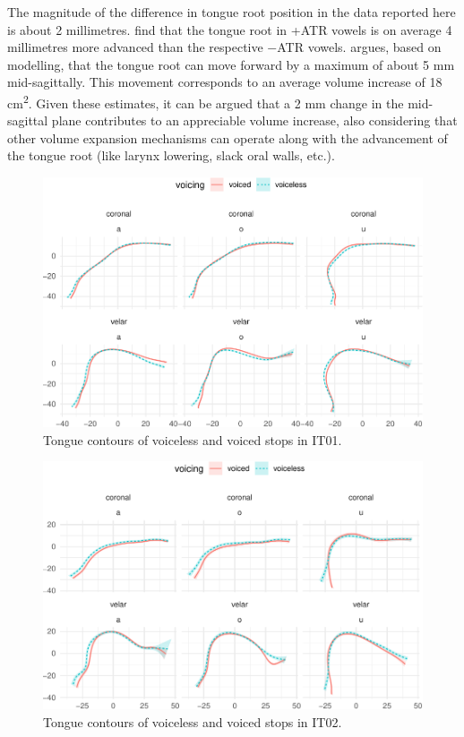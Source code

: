 \documentclass[12pt,]{article}
\begin{document}
The magnitude of the difference in tongue root position in the data
reported here is about 2 millimetres. \citet{kirkham2017} find that the
tongue root in +ATR vowels is on average 4 millimetres more advanced
than the respective −ATR vowels. \citet{rothenberg1967} argues, based on
modelling, that the tongue root can move forward by a maximum of about 5
mm mid-sagittally. This movement corresponds to an average volume
increase of 18 cm\textsuperscript{2}. Given these estimates, it can be
argued that a 2 mm change in the mid-sagittal plane contributes to an
appreciable volume increase, also considering that other volume
expansion mechanisms can operate along with the advancement of the
tongue root (like larynx lowering, slack oral walls, etc.).

\begin{figure}

{\centering \includegraphics[width=.8\textwidth]{2018-polar-gam_files/figure-latex/tongues-it01-1} 

}

\caption{Tongue contours of voiceless and voiced stops in IT01.}\label{f:tongues-it01}
\end{figure}

\begin{figure}

{\centering \includegraphics[width=.8\textwidth]{2018-polar-gam_files/figure-latex/tongues-it02-1} 

}

\caption{Tongue contours of voiceless and voiced stops in IT02.}\label{f:tongues-it02}
\end{figure}
\end{document}
